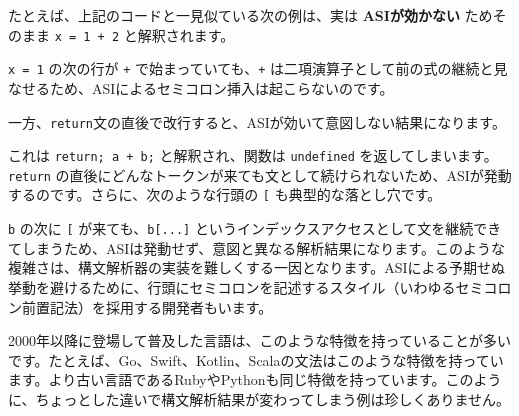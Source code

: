 たとえば、上記のコードと一見似ている次の例は、実は
\textbf{ASIが効かない} ためそのまま \texttt{x\ =\ 1\ +\ 2}
と解釈されます。

\begin{Shaded}
\begin{Highlighting}[]
\OperatorTok{=} 
\OperatorTok{+} 
\end{Highlighting}
\end{Shaded}

\texttt{x\ =\ 1} の次の行が \texttt{+} で始まっていても、\texttt{+}
は二項演算子として前の式の継続と見なせるため、ASIによるセミコロン挿入は起こらないのです。

一方、\texttt{return}文の直後で改行すると、ASIが効いて意図しない結果になります。

\begin{Shaded}
\begin{Highlighting}[]
\OperatorTok{+}\OperatorTok{;}
\end{Highlighting}
\end{Shaded}

これは \texttt{return;\ a\ +\ b;} と解釈され、関数は \texttt{undefined}
を返してしまいます。\texttt{return}
の直後にどんなトークンが来ても文として続けられないため、ASIが発動するのです。さらに、次のような行頭の
\texttt{{[}} も典型的な落とし穴です。

\begin{Shaded}
\begin{Highlighting}[]
\OperatorTok{=} \OperatorTok{,}\OperatorTok{=} 
\NormalTok{[a}\OperatorTok{,}\NormalTok{ b]}\KeywordTok{=\textgreater{}} 
\end{Highlighting}
\end{Shaded}

\texttt{b} の次に \texttt{{[}} が来ても、\texttt{b{[}...{]}}
というインデックスアクセスとして文を継続できてしまうため、ASIは発動せず、意図と異なる解析結果になります。このような複雑さは、構文解析器の実装を難しくする一因となります。ASIによる予期せぬ挙動を避けるために、行頭にセミコロンを記述するスタイル（いわゆるセミコロン前置記法）を採用する開発者もいます。

2000年以降に登場して普及した言語は、このような特徴を持っていることが多いです。たとえば、Go、Swift、Kotlin、Scalaの文法はこのような特徴を持っています。より古い言語であるRubyやPythonも同じ特徴を持っています。このように、ちょっとした違いで構文解析結果が変わってしまう例は珍しくありません。

